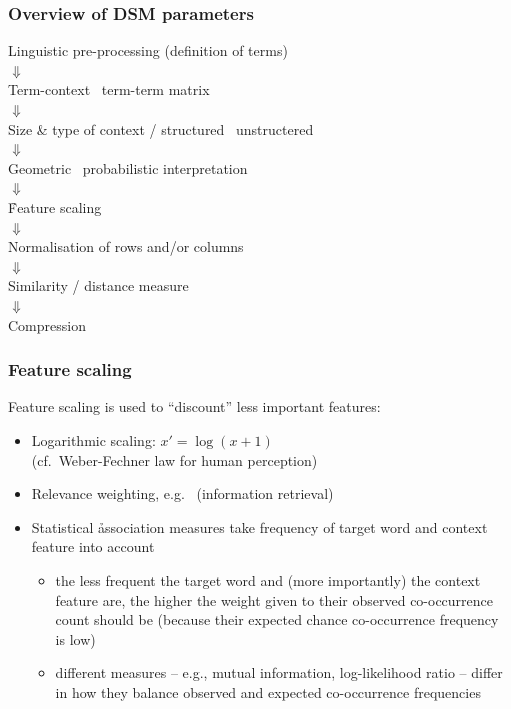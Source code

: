 \begin{frame}
  \frametitle{Overview of DSM parameters}

  \ungap[1]
  \begin{center}
    Linguistic pre-processing (definition of terms)\\
    $\Downarrow$\\
    Term-context \vs\ term-term matrix\\
    $\Downarrow$\\
    Size \& type of context / structured \vs\ unstructered\\
    $\Downarrow$\\
    Geometric \vs\ probabilistic interpretation\\
    $\Downarrow$\\
    \h{Feature scaling}\\
    $\Downarrow$\\
    Normalisation of rows and/or columns\\
    $\Downarrow$\\
    Similarity / distance measure\\
    $\Downarrow$\\
    Compression
  \end{center}
\end{frame}

\begin{frame}
  \frametitle{Feature scaling}

  Feature scaling is used to ``discount'' less important features:
  \begin{itemize}
  \item<1-> Logarithmic scaling: $x' = \log (x+1)$\\
    (cf.\ Weber-Fechner law for human perception)
  \item<2-> Relevance weighting, e.g.\  (information retrieval)
  \item<3-> Statistical \h{association measures} \citep{Evert:04phd,Evert:08}
    take frequency of target word and context feature into account
    \begin{itemize}
    \item the less frequent the target word and (more importantly) the
      context feature are, the higher the weight given to their
      observed co-occurrence count should be (because their expected
      chance co-occurrence frequency is low)
    \item different measures -- e.g., mutual information,
      log-likelihood ratio -- differ in how they balance observed and
      expected co-occurrence frequencies
    \end{itemize}
  \end{itemize}
\end{frame}

